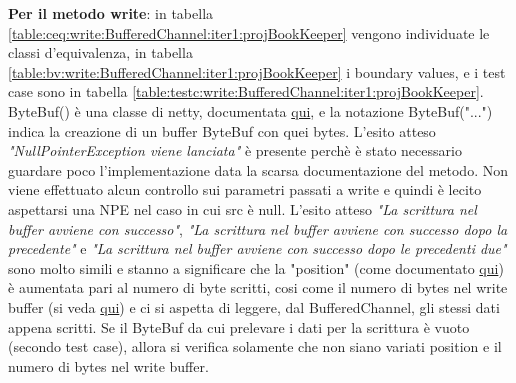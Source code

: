 \documentclass[10pt, a4paper]{article}
\newcommand{\gettablelabel}[5]{table:#1:#2:#3:iter#4:proj#5}
\def\bookkeeper{BookKeeper}
\begin{document}
	\textbf{Per il metodo write}: in tabella \ref{\gettablelabel{ceq}{write}{BufferedChannel}{1}{\bookkeeper}}
	vengono individuate le classi d'equivalenza, in tabella 
	\ref{\gettablelabel{bv}{write}{BufferedChannel}{1}{\bookkeeper}} 
	i boundary values, e i test case sono in tabella 
	\ref{\gettablelabel{testc}{write}{BufferedChannel}{1}{\bookkeeper}}.
	ByteBuf() è una classe di netty, documentata 
	\href{https://netty.io/4.0/api/io/netty/buffer/ByteBuf.html}{qui}, 
	e la notazione ByteBuf("...") indica la creazione di un buffer ByteBuf con quei bytes.
	L'esito atteso \textit{"NullPointerException viene lanciata"} è presente perchè è stato necessario
	guardare poco l'implementazione data la scarsa documentazione del metodo. Non viene effettuato alcun controllo
	sui parametri passati a write e quindi è lecito aspettarsi una NPE nel caso in cui src è null.
	L'esito atteso 
	\textit{"La scrittura nel buffer avviene con successo"}, 
	\textit{"La scrittura nel buffer avviene con successo dopo la precedente"} e 
	\textit{"La scrittura nel buffer avviene con successo dopo le precedenti due"}
	sono molto simili e stanno a significare che la "position"
	(come documentato 
	\href{https://bookkeeper.apache.org/docs/latest/api/javadoc/org/apache/bookkeeper/bookie/BufferedChannel.html#position()}
	{qui}) è aumentata pari al numero di byte scritti, cosi come il numero di bytes nel write buffer 
	(si veda 
	\href{https://bookkeeper.apache.org/docs/latest/api/javadoc/org/apache/bookkeeper/bookie/BufferedChannel.html#getNumOfBytesInWriteBuffer()}
	{qui}) e ci si aspetta di leggere, dal BufferedChannel, gli stessi dati appena scritti.
	Se il ByteBuf da cui prelevare i dati per la scrittura è vuoto (secondo test case), allora si verifica
	solamente che non siano variati position e il numero di bytes nel write buffer.
	
\end{document}
